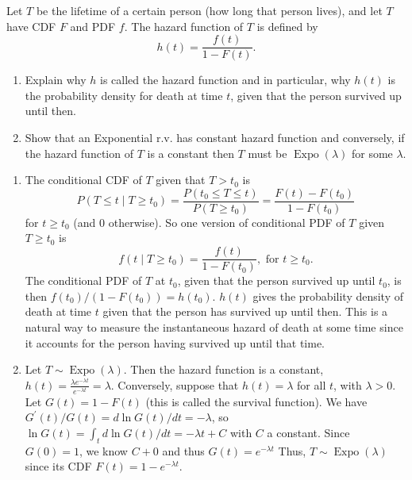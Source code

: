 

\setcounter{theorem}{45}
\begin{exercise}[BH.5.46] Let $T$ be the lifetime of a certain person (how long that person lives), and let $T$ have CDF $F$ and PDF $f$. The hazard function of $T$ is defined by
	$$
	h(t)=\frac{f(t)}{1-F(t)} .
	$$
	\begin{enumerate}
		\item   Explain why $h$ is called the hazard function and in particular, why $h(t)$ is the probability density for death at time $t$, given that the person survived up until then.
		\item  Show that an Exponential r.v. has constant hazard function and conversely, if the hazard function of $T$ is a constant then $T$ must be $\operatorname{Expo}(\lambda)$ for some $\lambda$.
	\end{enumerate} 
\begin{solution}
    \begin{enumerate}
        \item The conditional CDF of $T$ given that $T>t_0$ is
        $$
        P\left(T \leq t \mid T \geq t_0\right)=\frac{P\left(t_0 \leq T \leq t\right)}{P\left(T \geq t_0\right)}=\frac{F(t)-F\left(t_0\right)}{1-F\left(t_0\right)}
        $$
        for $t \geq t_0$ (and 0 otherwise). So one version of conditional PDF of $T$ given $T \geq t_0$ is
        $$
        f\left(t \mid T \geq t_0\right)=\frac{f(t)}{1-F\left(t_0\right)}, \text { for } t \geq t_0 .
        $$
        The conditional PDF of $T$ at $t_0$, given that the person survived up until $t_0$, is then $f\left(t_0\right) /\left(1-F\left(t_0\right)\right)=h\left(t_0\right)$. $h(t)$ gives the probability density of death at time $t$ given that the person has survived up until then. This is a natural way to measure the instantaneous hazard of death at some time since it accounts for the person having survived up until that time.
        \item Let $T \sim \operatorname{Expo}(\lambda)$. Then the hazard function is  a constant, $h(t)=\frac{\lambda e^{-\lambda t}}{e^{-\lambda t}}=\lambda$. Conversely, suppose that $h(t)=\lambda$ for all $t$, with $\lambda >0$. Let $ G(t)=1-F(t)$ (this is called the survival function). We have $G^{\prime}(t) / G(t)=d\ln G(t)/dt=-\lambda$, so $\ln G(t)=\int_t d\ln G(t)/dt ={-\lambda t+C}$ with $C$ a constant. Since $G(0)=1$, we know $C+0$ and thus $G(t) =e^{-\lambda t}$ Thus, $T \sim \operatorname{Expo}(\lambda)$ since its CDF $F(t)=1-e^{-\lambda t}$.
    \end{enumerate}
\end{solution}
\end{exercise}


